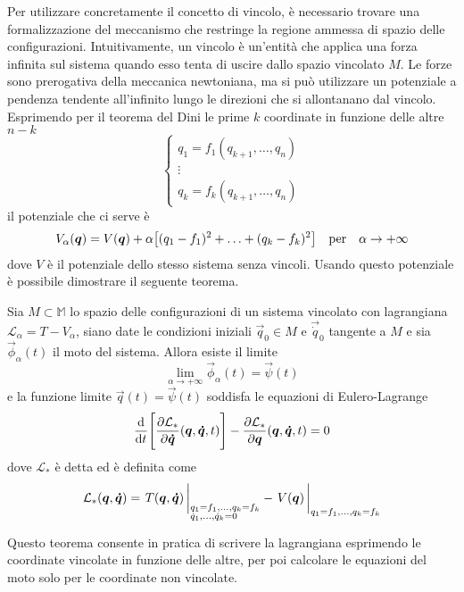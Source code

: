 Per utilizzare concretamente il concetto di vincolo, è necessario trovare una formalizzazione del meccanismo che restringe la regione ammessa di spazio delle configurazioni. Intuitivamente, un vincolo è un'entità che applica una forza infinita sul sistema quando esso tenta di uscire dallo spazio vincolato $M$. Le forze sono prerogativa della meccanica newtoniana, ma si può utilizzare un potenziale a pendenza tendente all'infinito lungo le direzioni che si allontanano dal vincolo. Esprimendo per il teorema del Dini le prime $k$ coordinate in funzione delle altre $n-k$ \begin{equation*}
\begin{cases}
  q_1 = f_1(q_{k+1}, \ldots, q_n) \\
  \vdots \\
  q_k = f_k(q_{k+1}, \ldots, q_n)
\end{cases}
\end{equation*} 
il potenziale che ci serve è \begin{equation*}
  V_{\alpha}(\vec{q}) = V(\vec{q}) + \alpha\big[(q_1-f_1)^2 + \ldots + (q_k-f_k)^2 \big] \qqtext{per} \alpha \to +\infty
\end{equation*} 
dove $V$ è il potenziale dello stesso sistema senza vincoli. Usando questo potenziale è possibile dimostrare il seguente teorema.
\begin{theorem}
  Sia $M \subset \mathbb{M}$ lo spazio delle configurazioni di un sistema vincolato con lagrangiana $\mathcal{L}_{\alpha} = T -V_{\alpha}$, siano date le condizioni iniziali $\vec{q}_0 \in  M$ e $\vec{\dot{q}}_0$ tangente a $M$ e sia $\vec{\phi}_{\alpha}(t)$ il moto del sistema. Allora esiste il limite \begin{equation*}
  \lim_{\alpha \to +\infty} \vec{\phi}_{\alpha}(t) = \vec{\psi}(t)
  \end{equation*} 
  e la funzione limite $\vec{q}(t) = \vec{\psi}(t)$ soddisfa le equazioni di Eulero-Lagrange \begin{equation*}
    \dv{t}\Bigg[\pdv{\mathcal{L}_{*}}{\boldsymbol{\dot{q}}}()(\boldsymbol{q},\boldsymbol{\dot{q}},t)\Bigg] - \pdv{\mathcal{L}_{*}}{\boldsymbol{q}}()(\boldsymbol{q},\boldsymbol{\dot{q}},t) = 0
  \end{equation*} 
  dove $\mathcal{L}_*$ è detta  ed è definita come \begin{equation*}
  \mathcal{L}_*(\vec{q},\vec{\dot{q}}) = \eval{T(\vec{q},\vec{\dot{q}})\,}_{\begin{subarray}{l}
    q_1=f_1, \ldots, q_k=f_k \\
    \dot{q}_1, \ldots, \dot{q}_k = 0
  \end{subarray}} - \eval{V(\vec{q})\,}_{q_1=f_1, \ldots, q_k=f_k}
  \end{equation*} 
\end{theorem} 
Questo teorema consente in pratica di scrivere la lagrangiana esprimendo le coordinate vincolate in funzione delle altre, per poi calcolare le equazioni del moto solo per le coordinate non vincolate. 

